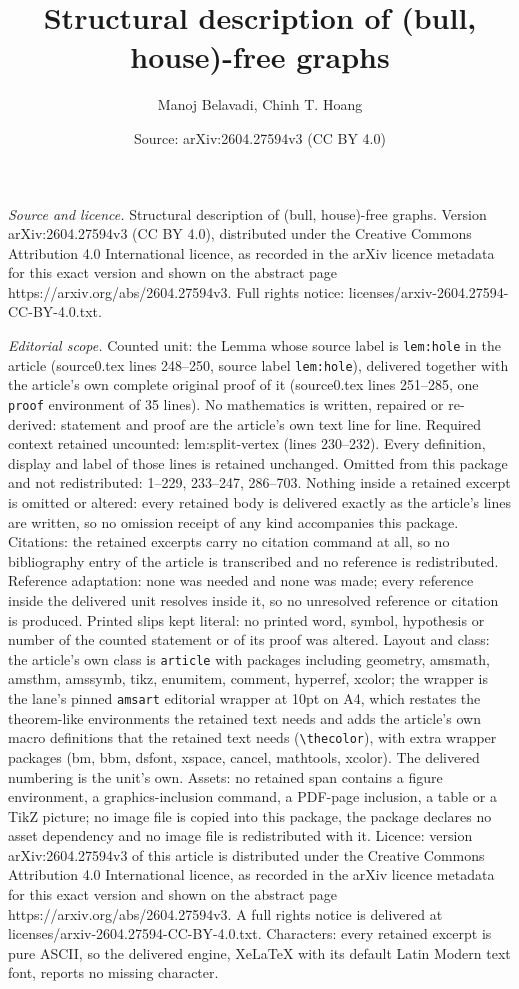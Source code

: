 \documentclass[10pt,a4paper]{amsart}
\title[Structural description of (bull, house)-free graphs]{Structural description of (bull, house)-free graphs}
\author{Manoj Belavadi, Chinh T. Hoang}
\date{Source: arXiv:2604.27594v3 (CC BY 4.0)}
\begin{document}
\maketitle

\noindent\emph{Source and licence.} Structural description of (bull, house)-free graphs. Version arXiv:2604.27594v3 (CC BY 4.0), distributed under the Creative Commons Attribution 4.0 International licence, as recorded in the arXiv licence metadata for this exact version and shown on the abstract page https://arxiv.org/abs/2604.27594v3. Full rights notice: licenses/arxiv-2604.27594-CC-BY-4.0.txt.\par\smallskip

\noindent\textit{Editorial scope.} Counted unit: the Lemma whose source label is \texttt{lem:hole} in the article (source0.tex lines 248--250, source label \texttt{lem:hole}), delivered together with the article's own complete original proof of it (source0.tex lines 251--285, one \texttt{proof} environment of 35 lines). No mathematics is written, repaired or re-derived: statement and proof are the article's own text line for line. Required context retained uncounted: lem:split-vertex (lines 230--232). Every definition, display and label of those lines is retained unchanged. Omitted from this package and not redistributed: 1--229, 233--247, 286--703. Nothing inside a retained excerpt is omitted or altered: every retained body is delivered exactly as the article's lines are written, so no omission receipt of any kind accompanies this package. Citations: the retained excerpts carry no citation command at all, so no bibliography entry of the article is transcribed and no reference is redistributed. Reference adaptation: none was needed and none was made; every reference inside the delivered unit resolves inside it, so no unresolved reference or citation is produced. Printed slips kept literal: no printed word, symbol, hypothesis or number of the counted statement or of its proof was altered. Layout and class: the article's own class is \texttt{article} with packages including geometry, amsmath, amsthm, amssymb, tikz, enumitem, comment, hyperref, xcolor; the wrapper is the lane's pinned \texttt{amsart} editorial wrapper at 10pt on A4, which restates the theorem-like environments the retained text needs and adds the article's own macro definitions that the retained text needs (\texttt{\textbackslash thecolor}), with extra wrapper packages (bm, bbm, dsfont, xspace, cancel, mathtools, xcolor). The delivered numbering is the unit's own. Assets: no retained span contains a figure environment, a graphics-inclusion command, a PDF-page inclusion, a table or a TikZ picture; no image file is copied into this package, the package declares no asset dependency and no image file is redistributed with it. Licence: version arXiv:2604.27594v3 of this article is distributed under the Creative Commons Attribution 4.0 International licence, as recorded in the arXiv licence metadata for this exact version and shown on the abstract page https://arxiv.org/abs/2604.27594v3. A full rights notice is delivered at licenses/arxiv-2604.27594-CC-BY-4.0.txt. Characters: every retained excerpt is pure ASCII, so the delivered engine, XeLaTeX with its default Latin Modern text font, reports no missing character.
\end{document}
